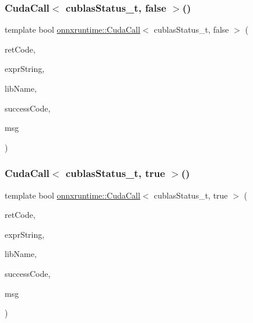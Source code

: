 \subsubsection{\texorpdfstring{Cuda\+Call$<$ cublas\+Status\+\_\+t, false $>$()}{CudaCall< cublasStatus\_t, false >()}}
{\footnotesize\ttfamily template bool \mbox{\hyperlink{namespaceonnxruntime_a4bcb94c50ee1b7834c90f0c6334986e0}{onnxruntime\+::\+Cuda\+Call}}$<$ cublas\+Status\+\_\+t, false $>$ (\begin{DoxyParamCaption}\item[{cublas\+Status\+\_\+t}]{ret\+Code,  }\item[{const char $\ast$}]{expr\+String,  }\item[{const char $\ast$}]{lib\+Name,  }\item[{cublas\+Status\+\_\+t}]{success\+Code,  }\item[{const char $\ast$}]{msg }\end{DoxyParamCaption})}

\mbox{\label{namespaceonnxruntime_ab4e859887c685a6413e9ecb84a008845}} 
\subsubsection{\texorpdfstring{Cuda\+Call$<$ cublas\+Status\+\_\+t, true $>$()}{CudaCall< cublasStatus\_t, true >()}}
{\footnotesize\ttfamily template bool \mbox{\hyperlink{namespaceonnxruntime_a4bcb94c50ee1b7834c90f0c6334986e0}{onnxruntime\+::\+Cuda\+Call}}$<$ cublas\+Status\+\_\+t, true $>$ (\begin{DoxyParamCaption}\item[{cublas\+Status\+\_\+t}]{ret\+Code,  }\item[{const char $\ast$}]{expr\+String,  }\item[{const char $\ast$}]{lib\+Name,  }\item[{cublas\+Status\+\_\+t}]{success\+Code,  }\item[{const char $\ast$}]{msg }\end{DoxyParamCaption})}

\mbox{\label{namespaceonnxruntime_a8eacc603cd3a16dfe0340fdc2528ba47}} 
